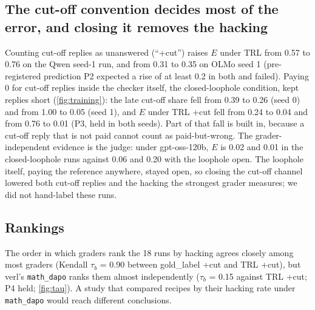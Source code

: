 \documentclass[10pt]{article}
\newcommand{\E}{E}
\begin{document}
\subsection{The cut-off convention decides most of the error, and closing it removes the hacking}
Counting cut-off replies as unanswered (``+cut'') raises $\E$ under TRL from 0.57 to 0.76 on the Qwen
seed-1 run, and from 0.31 to 0.35 on OLMo seed 1 (pre-registered prediction P2 expected a rise of at least
0.2 in both and failed). Paying 0 for cut-off replies inside the checker itself, the closed-loophole
condition, kept replies short (\cref{fig:training}): the late cut-off share fell from 0.39 to 0.26 (seed 0)
and from 1.00 to 0.05 (seed 1), and $\E$ under TRL +cut fell from 0.24 to 0.04 and from 0.76 to 0.01 (P3, held in both seeds). Part of that fall is built in, because a cut-off reply that is not paid cannot count as paid-but-wrong. The grader-independent evidence is the judge: under gpt-oss-120b, $\E$ is 0.02 and 0.01 in the closed-loophole runs against 0.06 and 0.20 with the loophole open. The loophole itself, paying the reference anywhere, stayed open, so closing the cut-off channel lowered both cut-off replies and the hacking the strongest grader measures; we did not hand-label these runs.

\subsection{Rankings}
The order in which graders rank the 18 runs by hacking agrees closely among most graders (Kendall $\tau_b$ = 0.90 between gold\_label +cut and TRL +cut), but verl's \texttt{math\_dapo} ranks them almost
independently ($\tau_b$ = 0.15 against TRL +cut; P4 held; \cref{fig:tau}). A study that compared recipes by
their hacking rate under \texttt{math\_dapo} would reach different conclusions.
\end{document}
